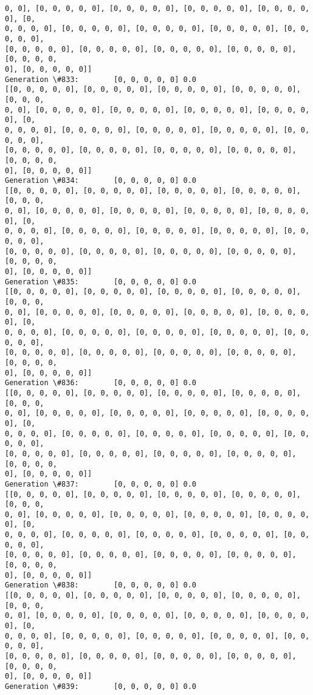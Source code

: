 \documentclass[11pt]{article}
\begin{document}
\begin{Verbatim}[commandchars=\\\{\}]
0, 0], [0, 0, 0, 0, 0], [0, 0, 0, 0, 0], [0, 0, 0, 0, 0], [0, 0, 0, 0, 0], [0,
0, 0, 0, 0], [0, 0, 0, 0, 0], [0, 0, 0, 0, 0], [0, 0, 0, 0, 0], [0, 0, 0, 0, 0],
[0, 0, 0, 0, 0], [0, 0, 0, 0, 0], [0, 0, 0, 0, 0], [0, 0, 0, 0, 0], [0, 0, 0, 0,
0], [0, 0, 0, 0, 0]]
Generation \#833:        [0, 0, 0, 0, 0] 0.0
[[0, 0, 0, 0, 0], [0, 0, 0, 0, 0], [0, 0, 0, 0, 0], [0, 0, 0, 0, 0], [0, 0, 0,
0, 0], [0, 0, 0, 0, 0], [0, 0, 0, 0, 0], [0, 0, 0, 0, 0], [0, 0, 0, 0, 0], [0,
0, 0, 0, 0], [0, 0, 0, 0, 0], [0, 0, 0, 0, 0], [0, 0, 0, 0, 0], [0, 0, 0, 0, 0],
[0, 0, 0, 0, 0], [0, 0, 0, 0, 0], [0, 0, 0, 0, 0], [0, 0, 0, 0, 0], [0, 0, 0, 0,
0], [0, 0, 0, 0, 0]]
Generation \#834:        [0, 0, 0, 0, 0] 0.0
[[0, 0, 0, 0, 0], [0, 0, 0, 0, 0], [0, 0, 0, 0, 0], [0, 0, 0, 0, 0], [0, 0, 0,
0, 0], [0, 0, 0, 0, 0], [0, 0, 0, 0, 0], [0, 0, 0, 0, 0], [0, 0, 0, 0, 0], [0,
0, 0, 0, 0], [0, 0, 0, 0, 0], [0, 0, 0, 0, 0], [0, 0, 0, 0, 0], [0, 0, 0, 0, 0],
[0, 0, 0, 0, 0], [0, 0, 0, 0, 0], [0, 0, 0, 0, 0], [0, 0, 0, 0, 0], [0, 0, 0, 0,
0], [0, 0, 0, 0, 0]]
Generation \#835:        [0, 0, 0, 0, 0] 0.0
[[0, 0, 0, 0, 0], [0, 0, 0, 0, 0], [0, 0, 0, 0, 0], [0, 0, 0, 0, 0], [0, 0, 0,
0, 0], [0, 0, 0, 0, 0], [0, 0, 0, 0, 0], [0, 0, 0, 0, 0], [0, 0, 0, 0, 0], [0,
0, 0, 0, 0], [0, 0, 0, 0, 0], [0, 0, 0, 0, 0], [0, 0, 0, 0, 0], [0, 0, 0, 0, 0],
[0, 0, 0, 0, 0], [0, 0, 0, 0, 0], [0, 0, 0, 0, 0], [0, 0, 0, 0, 0], [0, 0, 0, 0,
0], [0, 0, 0, 0, 0]]
Generation \#836:        [0, 0, 0, 0, 0] 0.0
[[0, 0, 0, 0, 0], [0, 0, 0, 0, 0], [0, 0, 0, 0, 0], [0, 0, 0, 0, 0], [0, 0, 0,
0, 0], [0, 0, 0, 0, 0], [0, 0, 0, 0, 0], [0, 0, 0, 0, 0], [0, 0, 0, 0, 0], [0,
0, 0, 0, 0], [0, 0, 0, 0, 0], [0, 0, 0, 0, 0], [0, 0, 0, 0, 0], [0, 0, 0, 0, 0],
[0, 0, 0, 0, 0], [0, 0, 0, 0, 0], [0, 0, 0, 0, 0], [0, 0, 0, 0, 0], [0, 0, 0, 0,
0], [0, 0, 0, 0, 0]]
Generation \#837:        [0, 0, 0, 0, 0] 0.0
[[0, 0, 0, 0, 0], [0, 0, 0, 0, 0], [0, 0, 0, 0, 0], [0, 0, 0, 0, 0], [0, 0, 0,
0, 0], [0, 0, 0, 0, 0], [0, 0, 0, 0, 0], [0, 0, 0, 0, 0], [0, 0, 0, 0, 0], [0,
0, 0, 0, 0], [0, 0, 0, 0, 0], [0, 0, 0, 0, 0], [0, 0, 0, 0, 0], [0, 0, 0, 0, 0],
[0, 0, 0, 0, 0], [0, 0, 0, 0, 0], [0, 0, 0, 0, 0], [0, 0, 0, 0, 0], [0, 0, 0, 0,
0], [0, 0, 0, 0, 0]]
Generation \#838:        [0, 0, 0, 0, 0] 0.0
[[0, 0, 0, 0, 0], [0, 0, 0, 0, 0], [0, 0, 0, 0, 0], [0, 0, 0, 0, 0], [0, 0, 0,
0, 0], [0, 0, 0, 0, 0], [0, 0, 0, 0, 0], [0, 0, 0, 0, 0], [0, 0, 0, 0, 0], [0,
0, 0, 0, 0], [0, 0, 0, 0, 0], [0, 0, 0, 0, 0], [0, 0, 0, 0, 0], [0, 0, 0, 0, 0],
[0, 0, 0, 0, 0], [0, 0, 0, 0, 0], [0, 0, 0, 0, 0], [0, 0, 0, 0, 0], [0, 0, 0, 0,
0], [0, 0, 0, 0, 0]]
Generation \#839:        [0, 0, 0, 0, 0] 0.0

\end{Verbatim}
\end{document}
